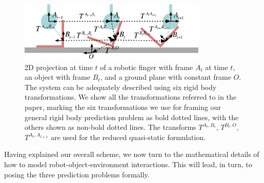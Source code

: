 \begin{figure}[t]
\centerline{\includegraphics[width=0.8\textwidth]{sequential-frames}
}
\caption[Setup1]{2D projection at time $t$ of a robotic finger with frame $A_{t}$ at time $t$,
an object with frame $B_{t}$, and a ground plane with constant frame
$O$. The system can be adequately described using six rigid body transformations. We show all the transformations referred to in the paper, marking the six transformations we use for framing our general rigid body prediction problem as bold dotted lines, with the others shown as non-bold dotted lines. The transforms $T^{A_t, B_t}$, $T^{B_t, O}$, $T^{A_{t}, A_{t+1}}$ are used for the reduced quasi-static formulation. %
}
\label{fig:Learning.setup1}
\end{figure}
Having explained our overall scheme, we now turn to the mathematical details of how to model robot-object-environment interactions. This will lead, in turn, to posing the three prediction problems formally.